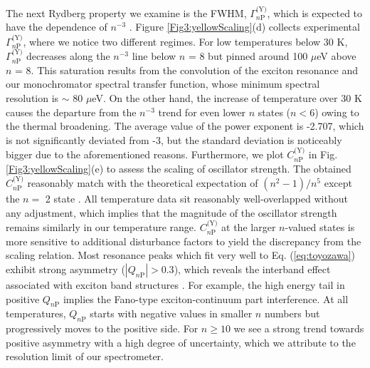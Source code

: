 \documentclass[aps,reprint,amsmath,amssymb,prb]{revtex4-1}
\begin{document}
The next Rydberg property we examine is the FWHM, $\Gamma_{n\text{P}}^{\text{(Y)}}$, which is expected to have the dependence of  $n^{-3}$ \cite{Toyozawa1958}. Figure \ref{Fig3:yellowScaling}(d) collects experimental $\Gamma_{n\text{P}}^{\text{(Y)}}$, where we notice two different regimes. For low temperatures below 30 K, $\Gamma_{n\text{P}}^{\text{(Y)}}$ decreases along the $n^{-3}$ line below $n $ = 8 but pinned around 100  $\mu$eV above  $n $ = 8. This saturation results from the convolution of the exciton resonance and our monochromator spectral transfer function, whose minimum spectral resolution is $\sim$ 80 $\mu$eV. On the other hand, the increase of temperature over 30 K causes the departure from  the $n^{-3}$ trend for even lower $n $ states ($n<6$) owing to the thermal broadening. The average value of the power exponent is -2.707, which is not significantly deviated from -3, but the standard deviation is noticeably bigger due to the aforementioned reasons. Furthermore, we plot $C_{n\text{P}}^{\text{(Y)}}$ in Fig. \ref{Fig3:yellowScaling}(e) to assess the scaling of oscillator strength. The obtained $C_{n\text{P}}^{\text{(Y)}}$ reasonably match with the theoretical expectation of $(n^{2}-1)/n^{5}$ except the $n =$ 2 state \cite{Heckotter2017,Kruger2019}. All temperature data sit reasonably well-overlapped without any adjustment, which implies that the magnitude of the oscillator strength remains similarly in our temperature range. $C_{n\text{P}}^{\text{(Y)}}$ at the larger $n$-valued states is more sensitive to additional disturbance factors to yield the discrepancy from the scaling relation.
Most resonance peaks which fit very well to Eq. (\ref{eq:toyozawa}) exhibit strong asymmetry ($|Q_{n\text{P}}| > 0.3$), which reveals the interband effect associated with exciton band structures \cite{Toyozawa1958}. For example, the high energy tail in positive $Q_{n\text{P}}$ implies the Fano-type exciton-continuum part interference.  At all temperatures, $Q_{n\text{P}}$ starts with negative values in smaller $n$ numbers but progressively moves to the positive side. For $n \geq 10$ we see a strong trend towards positive asymmetry with a high degree of uncertainty, which we attribute to the resolution limit of our spectrometer.
\end{document}
